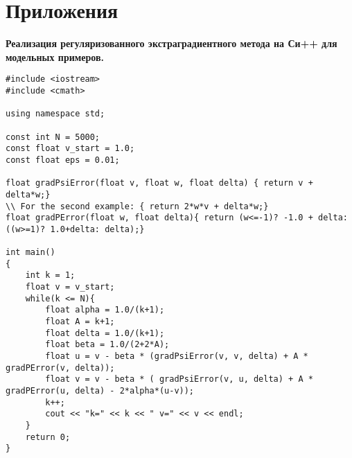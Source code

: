 {}
\section*{Приложения}
\noindent\textbf{Реализация регуляризованного экстраградиентного метода на Си++ для модельных примеров.}
\begin{lstlisting}[caption={Реализация метода на Си++}]
#include <iostream>
#include <cmath>

using namespace std;

const int N = 5000;
const float v_start = 1.0;
const float eps = 0.01;

float gradPsiError(float v, float w, float delta) { return v + delta*w;}
\\ For the second example: { return 2*w*v + delta*w;}
float gradPError(float w, float delta){ return (w<=-1)? -1.0 + delta: ((w>=1)? 1.0+delta: delta);}

int main()
{
	int k = 1;
	float v = v_start;
	while(k <= N){
		float alpha = 1.0/(k+1);
		float A = k+1;
		float delta = 1.0/(k+1);
		float beta = 1.0/(2+2*A);
		float u = v - beta * (gradPsiError(v, v, delta) + A * gradPError(v, delta));
		float v = v - beta * ( gradPsiError(v, u, delta) + A * gradPError(u, delta) - 2*alpha*(u-v));
		k++;
		cout << "k=" << k << " v=" << v << endl;
	}
	return 0;
}

\end{lstlisting}
